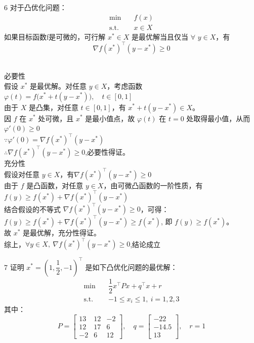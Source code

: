 \documentclass{article}
\newenvironment{problem_cn}[2][问题]{\begin{trivlist}
\item[\hskip \labelsep {\bfseries #1}\hskip \labelsep {\bfseries #2.}]}{\end{trivlist}}
\newenvironment{solution_cn}{%
  \begin{proof}[解答]%
  \kaishu  %
}{%
  \end{proof}%
}
\begin{document}
\vspace{0.25in}
\begin{problem_cn}{6}
对于凸优化问题：  
\[
\begin{split}
\min \quad & f(x) \\
\text{s.t.} \quad & x \in X
\end{split}
\]  
如果目标函数f是可微的，可行解 \( x^* \in X \) 是最优解当且仅当 $\forall$ \( y \in X \)，有  
\[
\nabla f(x^*)^\top (y - x^*) \geq 0
\]  
\end{problem_cn}
\begin{solution_cn}
\quad \\必要性\\
假设 \( x^* \) 是最优解。对任意 \(y \in X \)，考虑函数 $\varphi(t) = f\bigl( x^* + t(y - x^*) \bigr), \quad t \in [0,1]$\\
由于 \( X \) 是凸集，对任意 \( t \in [0,1] \)，有 \( x^* + t(y - x^*) \in X \)。\\因 \( f \) 在 \( x^* \) 处可微，且 \( x^* \) 是最小值点，故 \( \varphi(t) \) 在 \( t=0 \) 处取得最小值，从而$ \varphi'(0) \geq 0$\\
$\because \varphi'(0) = \nabla f(x^*)^\top (y - x^*)$\\
$\therefore \nabla f(x^*)^\top (y - x^*) \geq 0$,必要性得证。\\
充分性\\
假设对任意 \( y \in X \)，有$\nabla f(x^*)^\top (y - x^*) \geq 0$\\
由于 \( f \) 是凸函数，对任意 \( y \in X \)，由可微凸函数的一阶性质，有$f(y) \geq f(x^*) + \nabla f(x^*)^\top (y - x^*)$\\
结合假设的不等式 \( \nabla f(x^*)^\top (y - x^*) \geq 0 \)，可得：  
$f(y) \geq f(x^*) + \nabla f(x^*)^\top (y - x^*) \geq f(x^*)$,  
即 \( f(y) \geq f(x^*) \)。
\\故 \( x^* \) 是最优解，充分性得证。\\
综上，$\forall y \in X,\ \nabla f(x^*)^\top (y - x^*) \geq 0$,结论成立

\end{solution_cn}
\vspace{0.25in}
\begin{problem_cn}{7}
证明 \( x^* = \left( 1, \dfrac{1}{2}, -1 \right)^\top \) 是如下凸优化问题的最优解：  
\[
\begin{split}
\min \quad & \dfrac{1}{2} x^\top P x + q^\top x + r \\
\text{s.t.} \quad & -1 \leq x_i \leq 1, \ i=1,2,3
\end{split}
\]  
其中：  
\[
P = \begin{bmatrix} 13 & 12 & -2 \\ 12 & 17 & 6 \\ -2 & 6 & 12 \end{bmatrix}, \quad q = \begin{bmatrix} -22 \\ -14.5 \\ 13 \end{bmatrix}, \quad r = 1
\]  
\end{problem_cn}
\end{document}
